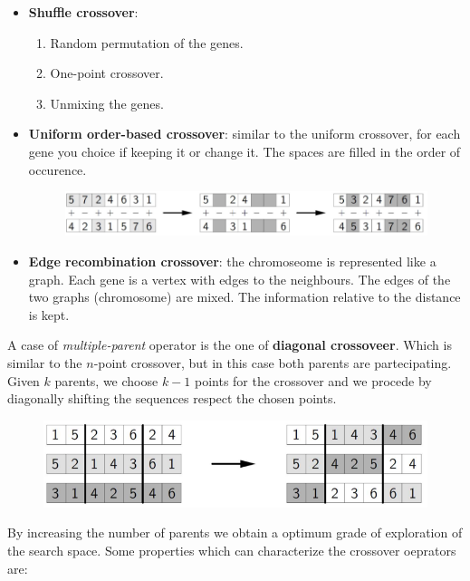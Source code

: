 \documentclass{article}
\begin{document}
\begin{itemize}
    \item \textbf{Shuffle crossover}:
          \begin{enumerate}
              \item Random permutation of the genes.
              \item One-point crossover.
              \item Unmixing the genes.
          \end{enumerate}
    \item \textbf{Uniform order-based crossover}: similar to the uniform crossover,
          for each gene you choice if keeping it or change it. The spaces are filled
          in the order of occurence.
          \begin{figure}[H]
              \centering
              \includegraphics[scale=0.5]{images/uacrossover.png}
          \end{figure}
    \item \textbf{Edge recombination crossover}: the chromoseome is represented like
          a graph. Each gene is a vertex with edges to the neighbours. The edges of the
          two graphs (chromosome) are mixed. The information relative to the
          distance is kept.
\end{itemize}
A case of \textit{multiple-parent} operator is the one of \textbf{diagonal crossoveer}.
Which is similar to the $n$-point crossover, but in this case both parents are
partecipating. Given $k$ parents, we choose $k-1$ points for the crossover and we
procede by diagonally shifting the sequences respect the chosen points.
\begin{figure}[H]
    \centering
    \includegraphics[scale=0.5]{images/dcrossover.png}
\end{figure}
By increasing the number of parents we obtain a optimum grade of exploration of the
search space. Some properties which can characterize the crossover oeprators are:
\end{document}

